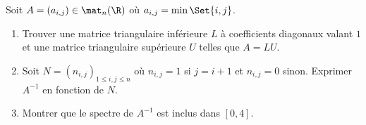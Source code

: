\begin{enonce}
\begin{exercise}[ID={RMS123 E580, Mines PSI},subtitle={},tags={}, difficulty={0}]
Soit $A=\left( a_{i,j} \right)\in\mat_n(\R)$ où $a_{i,j}=\min\Set{i,j}$.
\begin{enumerate}
  \item Trouver une matrice triangulaire inférieure $L$ à coefficients diagonaux valant $1$ et une matrice triangulaire supérieure $U$ telles que $A=LU$.
  \item Soit $N=\left( n_{i,j} \right)_{1\leq i,j\leq n}$ où $n_{i,j}=1$ si $j=i+1$ et $n_{i,j}=0$ sinon.
    Exprimer $A^{-1}$ en fonction de $N$.
  \item Montrer que le spectre de $A^{-1}$ est inclus dans $\left[0,4\right]$.
\end{enumerate}
\end{exercise}
\begin{solution}
\end{solution}
\end{enonce}
